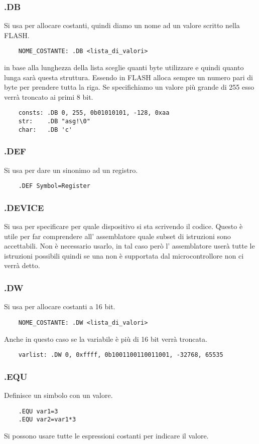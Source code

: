 \subsubsection{.DB}
Si usa per allocare costanti, quindi diamo un nome ad un valore scritto nella FLASH.
\begin{verbatim}
    NOME_COSTANTE: .DB <lista_di_valori>
\end{verbatim}
in base alla lunghezza della lista sceglie quanti byte utilizzare e quindi quanto lunga sarà questa struttura.
Essendo in FLASH alloca sempre un numero pari di byte per prendere tutta la riga.
Se specifichiamo un valore più grande di 255 esso verrà troncato ai primi 8 bit.
\begin{verbatim}
    consts: .DB 0, 255, 0b01010101, -128, 0xaa
    str:    .DB "asg!\0"
    char:   .DB 'c'
\end{verbatim}

\subsubsection{.DEF}
Si usa per dare un sinonimo ad un registro.
\begin{verbatim}
    .DEF Symbol=Register
\end{verbatim}

\subsubsection{.DEVICE}
Si usa per specificare per quale dispositivo si sta scrivendo il codice.
Questo è utile per far comprendere all' assemblatore quale subset di istruzioni sono accettabili.
Non è necessario usarlo, in tal caso però l' assemblatore userà tutte le istruzioni possibili quindi se una non è supportata dal microcontrollore non ci verrà detto.

\subsubsection{.DW}
Si usa per allocare costanti a 16 bit.
\begin{verbatim}
    NOME_COSTANTE: .DW <lista_di_valori>
\end{verbatim}
Anche in questo caso se la variabile è più di 16 bit verrà troncata.
\begin{verbatim}
    varlist: .DW 0, 0xffff, 0b1001100110011001, -32768, 65535
\end{verbatim}

\subsubsection{.EQU}
Definisce un simbolo con un valore.
\begin{verbatim}
    .EQU var1=3
    .EQU var2=var1*3
\end{verbatim}
Si possono usare tutte le espressioni costanti per indicare il valore.

